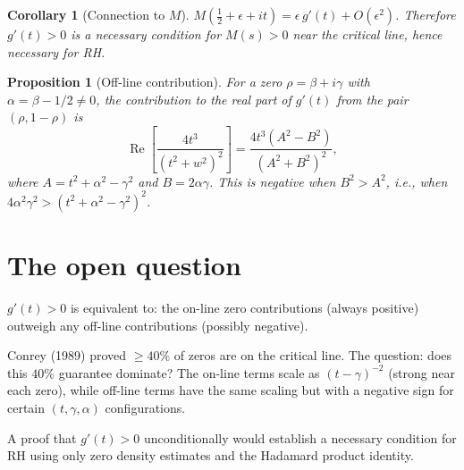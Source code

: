 \documentclass[11pt,a4paper]{article}
\newtheorem{corollary}{Corollary}
\newtheorem{proposition}{Proposition}
\DeclareMathOperator{\re}{Re}
\begin{document}
\begin{corollary}[Connection to $M$]
$M(\tfrac{1}{2}+\epsilon+it) = \epsilon\,g'(t) + O(\epsilon^2)$.
Therefore $g'(t) > 0$ is a \emph{necessary condition} for
$M(s) > 0$ near the critical line, hence necessary for RH.
\end{corollary}

\begin{proposition}[Off-line contribution]
For a zero $\rho = \beta + i\gamma$ with
$\alpha = \beta - 1/2 \neq 0$, the contribution to the real
part of $g'(t)$ from the pair $(\rho, 1-\rho)$ is
\begin{equation}
  \re\!\left[\frac{4t^3}{(t^2+w^2)^2}\right]
  = \frac{4t^3(A^2-B^2)}{(A^2+B^2)^2},
\end{equation}
where $A = t^2+\alpha^2-\gamma^2$ and $B = 2\alpha\gamma$.
This is negative when $B^2 > A^2$, i.e., when
$4\alpha^2\gamma^2 > (t^2+\alpha^2-\gamma^2)^2$.
\end{proposition}

\section{The open question}

$g'(t) > 0$ is equivalent to: the on-line zero contributions
(always positive) outweigh any off-line contributions
(possibly negative).

Conrey (1989) proved $\geq 40\%$ of zeros are on the
critical line. The question: does this $40\%$ guarantee
dominate? The on-line terms scale as $(t-\gamma)^{-2}$
(strong near each zero), while off-line terms have the
same scaling but with a negative sign for certain
$(t,\gamma,\alpha)$ configurations.

A proof that $g'(t) > 0$ unconditionally would establish a
necessary condition for RH using only zero density estimates
and the Hadamard product identity.
\end{document}
